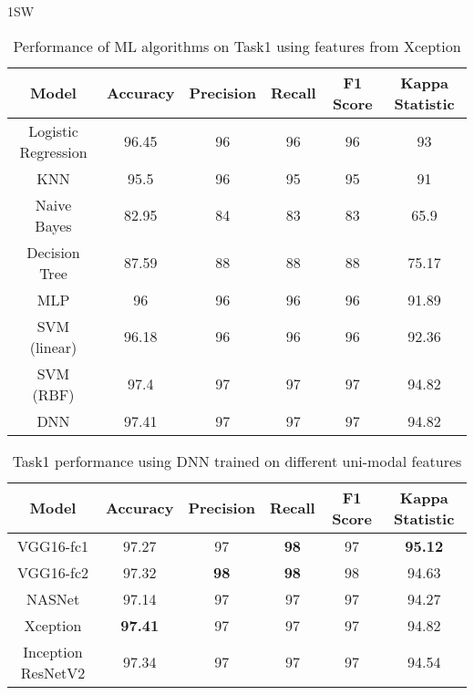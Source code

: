 \documentclass[electronics,article,accept ,moreauthors,pdftex]{mdpi}
\begin{document}
1SW \begin{table}[h!]
    \centering
    \caption{Performance of ML algorithms on Task1 using features from Xception}
    \label{tab:result_binary_xception}
    \begin{tabular}{|c|c|c|c|c|c|}
        \hline
        \textbf{Model} & \textbf{Accuracy} & \textbf{Precision} & \textbf{Recall} & \textbf{F1 Score} & \textbf{Kappa Statistic} \\ \hline
        Logistic Regression & 96.45 & 96 & 96 & 96 & 93    \\ \hline
        KNN                 & 95.5  & 96 & 95 & 95 & 91    \\ \hline
        Naive Bayes         & 82.95 & 84 & 83 & 83 & 65.9  \\ \hline
        Decision Tree       & 87.59 & 88 & 88 & 88 & 75.17 \\ \hline
        MLP                 & 96    & 96 & 96 & 96 & 91.89 \\ \hline
        SVM (linear)        & 96.18 & 96 & 96 & 96 & 92.36 \\ \hline
        SVM (RBF)           & 97.4  & 97 & 97 & 97 & 94.82 \\ \hline
        DNN                 & 97.41 & 97 & 97 & 97 & 94.82 \\ \hline
    \end{tabular}
\end{table}

\begin{table}[h!]
    \centering
    \caption{Task1 performance using DNN  trained on different uni-modal features}
    \label{tab:results_task1_uni}
    \begin{tabular}{|c|c|c|c|c|c|}
        \hline
        \textbf{Model} & \textbf{Accuracy} & \textbf{Precision} & \textbf{Recall} & \textbf{F1 Score} & \textbf{Kappa Statistic} \\
        \hline
VGG16-fc1                  & 97.27 & 97 & \textbf{98} & 97 & \textbf{95.12} \\ \hline
VGG16-fc2 & 97.32 & \textbf{98} & \textbf{98} & 98 & 94.63 \\ \hline
                NASNet & 97.14 & 97 & 97 & 97 & 94.27 \\ \hline
    Xception & \textbf{97.41} & 97 & 97 & 97 & 94.82 \\ \hline
Inception ResNetV2                & 97.34 & 97 & 97 & 97 & 94.54 \\ \hline
    \end{tabular}
\end{table}
\end{document}

